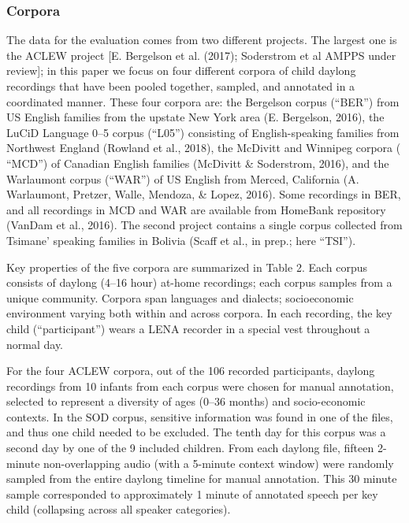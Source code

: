 \documentclass[english,floatsintext,man]{apa6}
\begin{document}
\subsubsection{Corpora}\label{corpora}

The data for the evaluation comes from two different projects. The
largest one is the ACLEW project {[}E. Bergelson et al. (2017);
Soderstrom et al AMPPS under review{]}; in this paper we focus on four
different corpora of child daylong recordings that have been pooled
together, sampled, and annotated in a coordinated manner. These four
corpora are: the Bergelson corpus (\enquote{BER}) from US English
families from the upstate New York area (E. Bergelson, 2016), the LuCiD
Language 0--5 corpus (\enquote{L05}) consisting of English-speaking
families from Northwest England (Rowland et al., 2018), the McDivitt and
Winnipeg corpora ( \enquote{MCD}) of Canadian English families (McDivitt
\& Soderstrom, 2016), and the Warlaumont corpus (\enquote{WAR}) of US
English from Merced, California (A. Warlaumont, Pretzer, Walle, Mendoza,
\& Lopez, 2016). Some recordings in BER, and all recordings in MCD and
WAR are available from HomeBank repository (VanDam et al., 2016). The
second project contains a single corpus collected from Tsimane' speaking
families in Bolivia (Scaff et al., in prep.; here \enquote{TSI}).

Key properties of the five corpora are summarized in Table 2. Each
corpus consists of daylong (4--16 hour) at-home recordings; each corpus
samples from a unique community. Corpora span languages and dialects;
socioeconomic environment varying both within and across corpora. In
each recording, the key child (\enquote{participant}) wears a LENA
recorder in a special vest throughout a normal day.

For the four ACLEW corpora, out of the 106 recorded participants,
daylong recordings from 10 infants from each corpus were chosen for
manual annotation, selected to represent a diversity of ages (0--36
months) and socio-economic contexts. In the SOD corpus, sensitive
information was found in one of the files, and thus one child needed to
be excluded. The tenth day for this corpus was a second day by one of
the 9 included children. From each daylong file, fifteen 2-minute
non-overlapping audio (with a 5-minute context window) were randomly
sampled from the entire daylong timeline for manual annotation. This 30
minute sample corresponded to approximately 1 minute of annotated speech
per key child (collapsing across all speaker categories).
\end{document}
